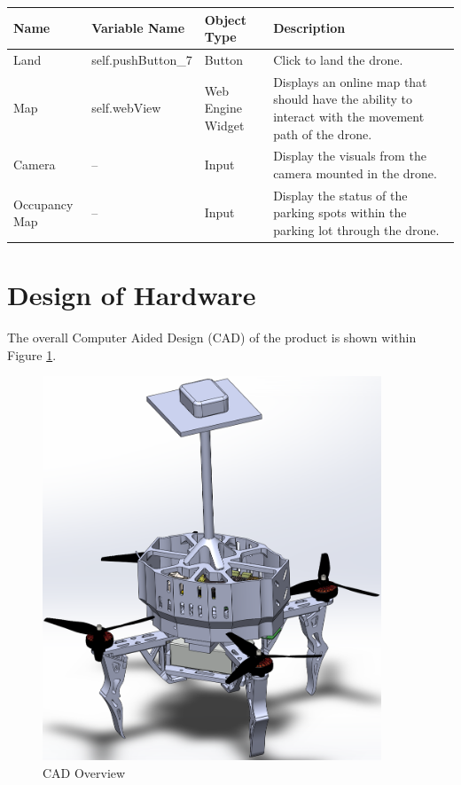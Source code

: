 \documentclass[12pt, titlepage]{article}
\begin{document}
\begin{table}[!h]
\begin{center}
\begin{tabular}{ | m{2.5cm} | m{3.5cm} | m{2.5cm} | m{6.5cm} | } 
\hline
Name & Variable Name & Object Type & Description \\
\hline
Land & self.pushButton_7 & Button & Click to land the drone. \\
\hline
Map & self.webView & Web Engine Widget & Displays an online map that should have the ability to interact with the movement path of the drone. \\
\hline
Camera & -- & Input & Display the visuals from the camera mounted in the drone. \\
\hline
Occupancy Map & -- & Input & Display the status of the parking spots within the parking lot through the drone. \\
\hline
\end{tabular}
\end{center}
\end{table}

\clearpage

\section{Design of Hardware}
\label{sec:mechHardware}

The overall Computer Aided Design (CAD) of the product is shown within Figure \ref{OverallCAD}. 

\begin{figure}[h!]
  \begin{center} 
  \caption{CAD Overview}
  \label{OverallCAD}
        \includegraphics[width=0.9\textwidth]{CAD_Overview.png}
  \end{center}
\end{figure}
\end{document}
